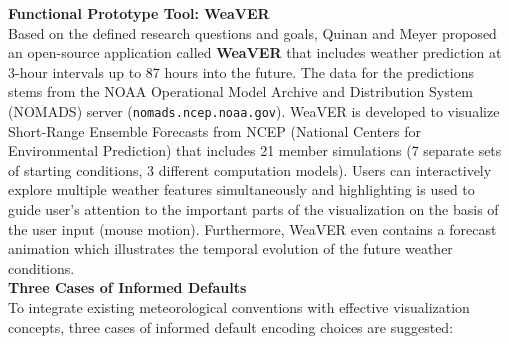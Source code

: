 \documentclass[citeauthoryear]{llncs}
\begin{document}
\textbf{Functional Prototype Tool: WeaVER \cite{quinan2016visually}} \\[0.2cm]
Based on the defined research questions and goals, Quinan and Meyer proposed an open-source application called \textbf{WeaVER} that includes weather prediction at 3-hour intervals up to 87 hours into the future. The data for the predictions stems from the NOAA Operational Model Archive and Distribution System (NOMADS) server (\texttt{nomads.ncep.noaa.gov}). WeaVER is developed to visualize Short-Range Ensemble Forecasts from NCEP (National Centers for Environmental Prediction) that includes 21 member simulations (7 separate sets of starting conditions, 3 different computation models). Users can interactively explore multiple weather features simultaneously and highlighting is used to guide user's attention to the important parts of the visualization on the basis of the user input (mouse motion). Furthermore, WeaVER even contains a forecast animation which illustrates the temporal evolution of the future weather conditions.\\
\newpage
\textbf{Three Cases of Informed Defaults \cite{quinan2016visually}} \\[0.2cm]
To integrate existing meteorological conventions with effective visualization concepts, three cases of informed default encoding choices are suggested:
\vspace*{-0.1cm}
\end{document}
